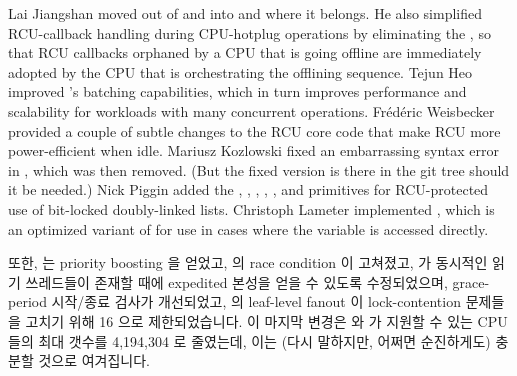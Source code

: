 Lai Jiangshan moved  out of
 and into  and
 where it belongs.
He also simplified RCU-callback handling during CPU-hotplug operations
by eliminating the , so that RCU callbacks
orphaned by a CPU that is going offline are immediately adopted by
the CPU that is orchestrating the offlining sequence.
Tejun Heo improved 's batching
capabilities, which in turn improves performance and scalability
for workloads with many concurrent 
operations.
Fr\'ed\'eric Weisbecker provided a couple of subtle changes to the
RCU core code that make RCU more power-efficient when idle.
Mariusz Kozlowski fixed an embarrassing syntax error in
, which was then removed.
(But the fixed version is there in the git tree should it be needed.)
Nick Piggin added the ,
,
,
,
, and
 primitives for RCU-protected use
of bit-locked doubly-linked lists.
Christoph Lameter implemented , which is an
optimized variant of
 for use in cases where the variable is accessed directly.
\fi

또한,  는 priority boosting 을 얻었고,
 의 race condition 이 고쳐졌고,
 가 동시적인 읽기 쓰레드들이 존재할 때에
expedited 본성을 얻을 수 있도록 수정되었으며, grace-period 시작/종료 검사가
개선되었고,  의 leaf-level fanout 이 lock-contention 문제들을
고치기 위해 16 으로 제한되었습니다.
이 마지막 변경은  와  가 지원할 수 있는 CPU
들의 최대 갯수를 4,194,304 로 줄였는데, 이는 (다시 말하지만, 어쩌면 순진하게도)
충분할 것으로 여겨집니다.


